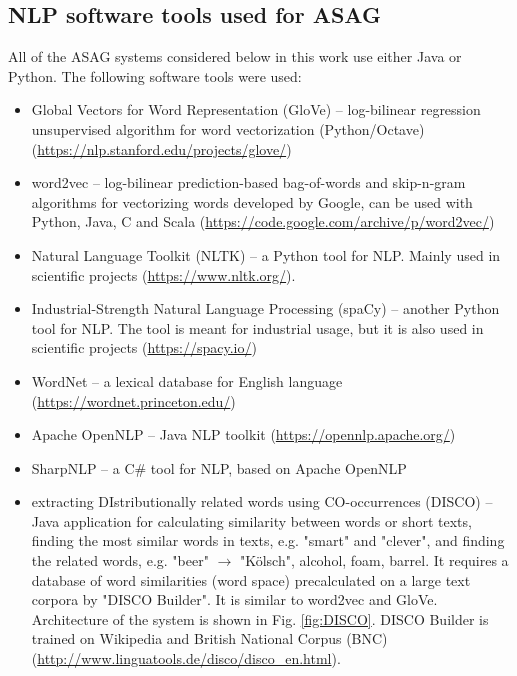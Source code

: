 \subsection{NLP software tools used for ASAG}

All of the ASAG systems considered below in this work use either Java or Python. The following software tools were used:

\begin{itemize}
\item Global Vectors for Word Representation (GloVe) -- log-bilinear regression unsupervised algorithm for word vectorization (Python/Octave) (\url{https://nlp.stanford.edu/projects/glove/})
\item word2vec -- log-bilinear prediction-based bag-of-words and skip-n-gram algorithms for vectorizing words developed by Google, can be used with Python, Java, C and Scala (\url{https://code.google.com/archive/p/word2vec/})
\item Natural Language Toolkit (NLTK) -- a Python tool for NLP. Mainly used in scientific projects (\url{https://www.nltk.org/}).
\item Industrial-Strength Natural Language Processing (spaCy) -- another Python tool for NLP. The tool is meant for industrial usage, but it is also used in scientific projects (\url{https://spacy.io/})
\item WordNet -- a lexical database for English language (\url{https://wordnet.princeton.edu/})
\item Apache OpenNLP -- Java NLP toolkit (\url{https://opennlp.apache.org/})
\item SharpNLP -- a C\# tool for NLP, based on Apache OpenNLP
\item extracting DIstributionally related words using CO-occurrences (DISCO) -- Java application for calculating similarity between words or short texts, finding the most similar words in texts, e.g. "smart" and "clever", and finding the related words, e.g. "beer" $\rightarrow$ "K\"olsch", alcohol, foam, barrel. It requires a database of word similarities (word space) precalculated on a large text corpora by "DISCO Builder". It is similar to word2vec and GloVe. Architecture of the system is shown in Fig. \ref{fig:DISCO}. DISCO Builder is trained on Wikipedia and British National Corpus (BNC) (\url{http://www.linguatools.de/disco/disco_en.html}). 
\begin{figure}[h!]
  \centering

\end{figure}
\end{itemize}
